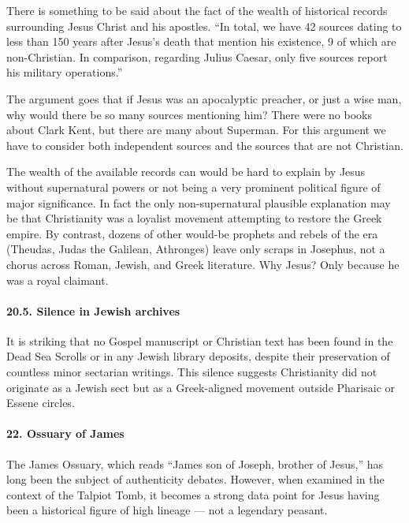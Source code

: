 There is something to be said about the fact of the wealth of historical records surrounding Jesus Christ and his apostles.
``In total, we have 42 sources dating to less than 150 years after Jesus's death that mention his existence, 9 of which are non-Christian.
In comparison, regarding Julius Caesar, only five sources report his military operations.''

The argument goes that if Jesus was an apocalyptic preacher, or just a wise man, why would there be so many sources mentioning him?
There were no books about Clark Kent, but there are many about Superman.
For this argument we have to consider both independent sources and the sources that are not Christian.

The wealth of the available records can would be hard to explain by Jesus without supernatural powers or not being a very prominent political figure of major significance.
In fact the only non-supernatural plausible explanation may be that Christianity was a loyalist movement attempting to restore the Greek empire.
By contrast, dozens of other would-be prophets and rebels of the era (Theudas, Judas the Galilean, Athronges) leave only scraps in Josephus, not a chorus across Roman, Jewish, and Greek literature. Why Jesus? Only because he was a royal claimant.

\paragraph{20.5.
Silence in Jewish archives}\label{par:silence-in-jewish-archives}

It is striking that no Gospel manuscript or Christian text has been found in the Dead Sea Scrolls or in any Jewish library deposits, despite their preservation of countless minor sectarian writings. This silence suggests Christianity did not originate as a Jewish sect but as a Greek-aligned movement outside Pharisaic or Essene circles.

\paragraph{22.
Ossuary of James}\label{par:ossuary-of-james}

The James Ossuary, which reads ``James son of Joseph, brother of Jesus,'' has long been the subject of authenticity debates.
However, when examined in the context of the Talpiot Tomb, it becomes a strong data point for Jesus having been a historical figure of high lineage --- not a legendary peasant.

